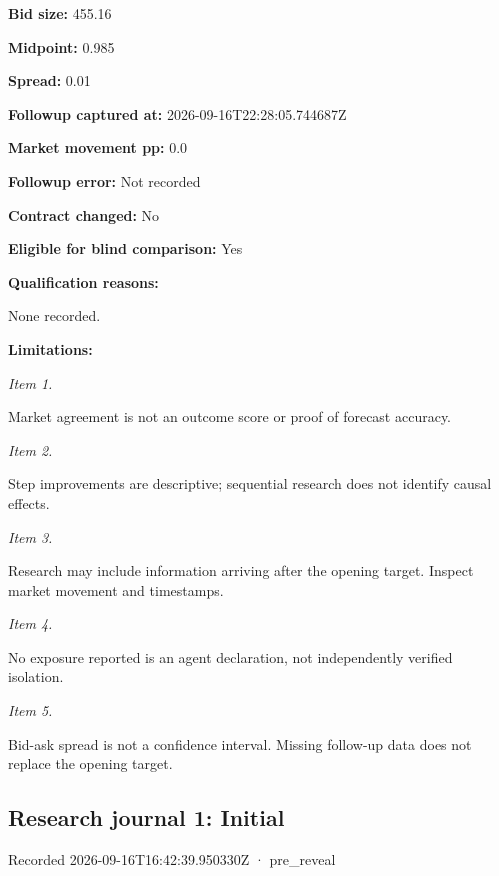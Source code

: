 \documentclass[11pt]{article}
\begin{document}
\par\noindent\textbf{Bid size:} 455.16

\par\noindent\textbf{Midpoint:} 0.985

\par\noindent\textbf{Spread:} 0.01

\par\noindent\textbf{Followup captured at:} 2026-09-16T22:28:05.744687Z

\par\noindent\textbf{Market movement pp:} 0.0

\par\noindent\textbf{Followup error:} Not recorded

\par\noindent\textbf{Contract changed:} No

\par\noindent\textbf{Eligible for blind comparison:} Yes

\par\noindent\textbf{Qualification reasons:} \par None recorded.

\par\noindent\textbf{Limitations:} \par \par\noindent\textit{Item 1.}\par Market agreement is not an outcome score or proof of forecast accuracy.

\par\noindent\textit{Item 2.}\par Step improvements are descriptive; sequential research does not identify causal effects.

\par\noindent\textit{Item 3.}\par Research may include information arriving after the opening target. Inspect market movement and timestamps.

\par\noindent\textit{Item 4.}\par No exposure reported is an agent declaration, not independently verified isolation.

\par\noindent\textit{Item 5.}\par Bid-ask spread is not a confidence interval. Missing follow-up data does not replace the opening target.

\subsection*{\textcolor{epdarkgreen}{Research journal 1: Initial}}
Recorded 2026-09-16T16:42:39.950330Z · pre\_reveal
\end{document}
